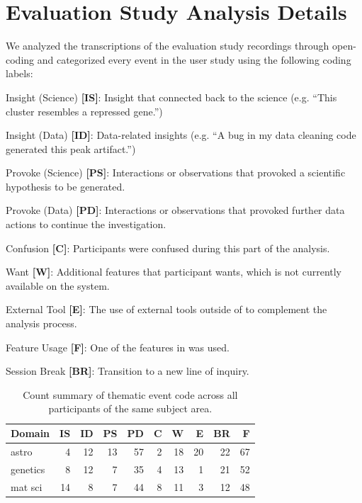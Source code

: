 \section{Evaluation Study Analysis Details\label{apdx:studydetails}}
We analyzed the transcriptions of the evaluation study recordings through open-coding and
categorized every event in the user study using the following coding labels:
\begin{denselist}
    \item Insight (Science) \textbf{[IS]}: Insight that connected back to the science (e.g. ``This cluster resembles a repressed gene.'')
    \item Insight (Data) \textbf{[ID]}: Data-related insights (e.g. ``A bug in my data cleaning code generated this peak artifact.'')
    \item Provoke (Science) \textbf{[PS]}: Interactions or observations that provoked a scientific hypothesis to be generated.
    \item Provoke (Data) \textbf{[PD]}: Interactions or observations that provoked further data actions to continue the investigation.
    \item Confusion \textbf{[C]}: Participants were confused during this part of the analysis.
    \item Want \textbf{[W]}: Additional features that participant wants, which is not currently available on the system.
    \item External Tool \textbf{[E]}: The use of external tools outside of \zvpp to complement the analysis process.
    \item Feature Usage \textbf{[F]}: One of the features in \zvpp was used.
    \item Session Break \textbf{[BR]}: Transition to a new line of inquiry.
\end{denselist}

\begin{table}[h!]
  \begin{tabular}{lrrrrrrrrr}
  \hline
   Domain           &   IS &   ID &   PS &   PD &   C &   W &   E &   BR &   F \\
  \hline
   astro            &    4 &   12 &   13 &   57 &   2 &  18 &  20 &   22 &  67 \\
   genetics         &    8 &   12 &    7 &   35 &   4 &  13 &   1 &   21 &  52 \\
   mat sci          &   14 &    8 &    7 &   44 &   8 &  11 &   3 &   12 &  48 \\
  \hline
  \end{tabular}
  \caption{Count summary of thematic event code across all participants of the same subject area.}
\end{table}

